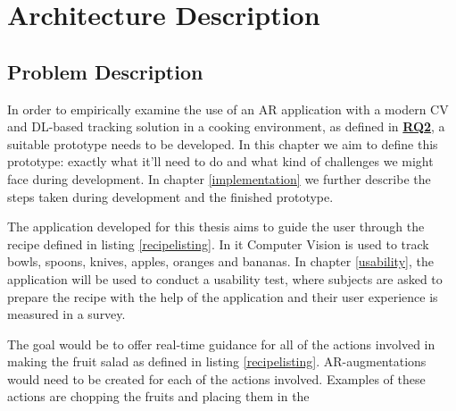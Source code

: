 \chapter{Architecture Description} \label{Arch description}

\section{Problem Description} \label{probDesc}

In order to empirically examine the use of an AR application with a modern CV 
and DL-based tracking solution in a cooking environment, as defined in 
\hyperref[rq2]{\textbf{RQ2}}, a suitable prototype needs to be developed. In 
this chapter we aim to define this prototype: exactly what it'll need to do and 
what kind of challenges we might face during development. In chapter 
\ref{implementation} we further describe the steps taken during development 
and the finished prototype. \par
	The application developed for this thesis aims to guide the user 
through the recipe defined in listing \ref{recipelisting}. In it Computer 
Vision is used to track bowls, spoons, knives, apples, oranges and bananas. 
In chapter \ref{usability}, the application will be used to conduct a usability 
test, where subjects are asked to prepare the recipe with the help of the 
application and their user experience is measured in a survey. \par
	The goal would be to offer real-time guidance for all of the actions 
involved in making the fruit salad as defined in listing \ref{recipelisting}. 
AR-augmentations would need to be created for each of the actions involved. 
Examples of these actions are chopping the fruits and placing them in the 
